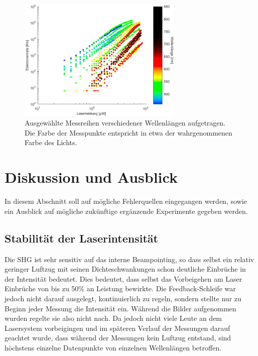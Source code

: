 \documentclass[bachelor,       %
               twoside,        %
               BCOR10mm,       %
               english,ngerman, %
               ]{GAUBM}
\begin{document}
\begin{figure}[h]
	\centering
	\includegraphics[width=0.7\textwidth]{Faecher_Daten}
	\caption{Ausgewählte Messreihen verschiedener Wellenlängen aufgetragen. Die Farbe der Messpunkte entspricht in etwa der wahrgenommenen Farbe des Lichts.}
	\label{fig:regenbogen}
\end{figure}






\chapter{Diskussion und Ausblick}
In diesem Abschnitt soll auf mögliche Fehlerquellen eingegangen werden, sowie ein Ausblick auf mögliche zukünftige ergänzende Experimente gegeben werden.

\section{Stabilität der Laserintensität}
Die SHG ist sehr sensitiv auf das interne Beampointing, so dass selbst ein relativ geringer Luftzug mit seinen Dichteschwankungen schon deutliche Einbrüche in der Intensität bedeutet.
Dies bedeutet, dass selbst das Vorbeigehen am Laser Einbrüche von bis zu 50\% an Leistung bewirkte.
Die Feedback-Schleife war jedoch nicht darauf ausgelegt, kontinuierlich zu regeln, sondern stellte nur zu Beginn jeder Messung die Intensität ein.
Während die Bilder aufgenommen wurden regelte sie also nicht nach.
Da jedoch nicht viele Leute an dem Lasersystem vorbeigingen und im späteren Verlauf der Messungen darauf geachtet wurde, dass während der Messungen kein Luftzug entstand, sind höchstens einzelne Datenpunkte von einzelnen Wellenlängen betroffen.
\end{document}
